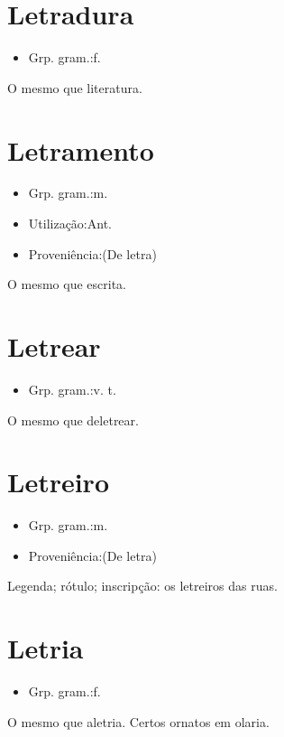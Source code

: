 \section{Letradura}
\begin{itemize}
\item {Grp. gram.:f.}
\end{itemize}
O mesmo que \textunderscore literatura\textunderscore .
\section{Letramento}
\begin{itemize}
\item {Grp. gram.:m.}
\end{itemize}
\begin{itemize}
\item {Utilização:Ant.}
\end{itemize}
\begin{itemize}
\item {Proveniência:(De \textunderscore letra\textunderscore )}
\end{itemize}
O mesmo que \textunderscore escrita\textunderscore .
\section{Letrear}
\begin{itemize}
\item {Grp. gram.:v. t.}
\end{itemize}
O mesmo que \textunderscore deletrear\textunderscore .
\section{Letreiro}
\begin{itemize}
\item {Grp. gram.:m.}
\end{itemize}
\begin{itemize}
\item {Proveniência:(De \textunderscore letra\textunderscore )}
\end{itemize}
Legenda; rótulo; inscripção: \textunderscore os letreiros das ruas\textunderscore .
\section{Letria}
\begin{itemize}
\item {Grp. gram.:f.}
\end{itemize}
O mesmo que \textunderscore aletria\textunderscore .
Certos ornatos em olaria.
